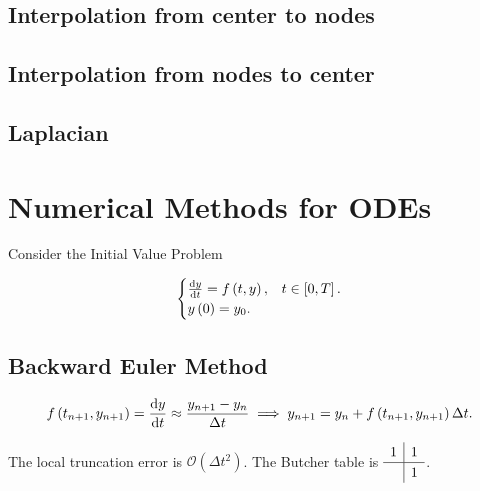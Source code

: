 \section{Interpolation from center to nodes}

\section{Interpolation from nodes to center}

\section{Laplacian}

\chapter{Numerical Methods for ODEs}


Consider the Initial Value Problem

\begin{equation*}
	\begin{cases}
		\diff{y}{t}=
		f\left(t,y\right), & t\in\left[0,T\right]. \\
		y\left(0\right)=
		y_{0}.             &
	\end{cases}
\end{equation*}

\section{Backward Euler Method}
\begin{equation*}
	f\left(t_{n+1},y_{n+1}\right)
	=\diff{y}{t}\approx
	\frac{y_{n+1}-y_{n}}{\Delta t}\implies
	y_{n+1}=
	y_{n}+
	f\left(t_{n+1},y_{n+1}\right)
	\Delta t.
\end{equation*}

The local truncation error is
\begin{math}
	\mathcal{O}
	\left(\Delta t^{2}\right)
\end{math}.
The Butcher table is
\begin{math}
	\renewcommand\arraystretch{1.2}
	\begin{array}
		{c|c}
		1 & 1 \\
		\hline
		  & 1
	\end{array}
\end{math}.

